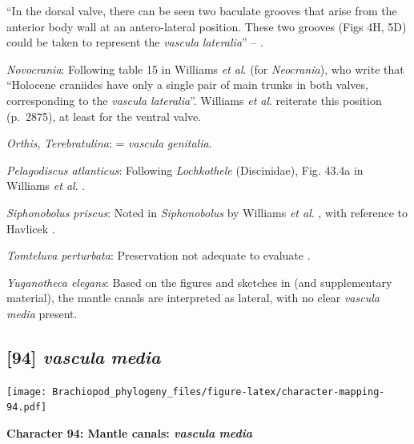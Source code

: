 \documentclass[openany]{book}
\theoremstyle{definition}
\theoremstyle{definition}
\theoremstyle{definition}
\theoremstyle{remark}
\begin{document}
``In the dorsal valve, there can be seen two baculate grooves that arise
from the\\
anterior body wall at an antero-lateral position. These two grooves
(Figs 4H, 5D) could be taken to represent the \emph{vascula}
\emph{lateralia}'' -- \citet{Zhang2007Agregarious}.

\hypertarget{Novocrania-coding-93}{}
\emph{Novocrania}: Following table 15 in Williams \emph{et al}.
\citeyearpar{Williams2000LinguliformeaCraniiformea} (for
\emph{Neocrania}), who write that ``Holocene craniides have only a
single pair of main trunks in both valves, corresponding to the
\emph{vascula} \emph{lateralia}''. Williams \emph{et al}.
\citeyearpar{Williams2007Supplement} reiterate this position (p.~2875),
at least for the ventral valve.

\hypertarget{Orthis-coding-93}{}
\emph{Orthis}, \emph{Terebratulina}: = \emph{vascula} \emph{genitalia}.

\hypertarget{Pelagodiscus_atlanticus-coding-93}{}
\emph{Pelagodiscus atlanticus}: Following \emph{Lochkothele}
(Discinidae), Fig. 43.4a in Williams \emph{et al}.
\citeyearpar{Williams2000LinguliformeaCraniiformea}.

\hypertarget{Siphonobolus_priscus-coding-93}{}
\emph{Siphonobolus priscus}: Noted in \emph{Siphonobolus} by Williams
\emph{et al}. \citeyearpar{Williams2000LinguliformeaCraniiformea}, with
reference to Havlicek \citeyearpar{Havlicek1982LingulaceaPaterinacea}.

\hypertarget{Tomteluva_perturbata-coding-93}{}
\emph{Tomteluva perturbata}: Preservation not adequate to evaluate
\citep{Streng2016Anew}.

\hypertarget{Yuganotheca_elegans-coding-93}{}
\emph{Yuganotheca elegans}: Based on the figures and sketches in
\citet{Zhang2014Anearly} (and supplementary material), the mantle canals
are interpreted as lateral, with no clear \emph{vascula} \emph{media}
present.

\subsection*{\texorpdfstring{{[}94{]} \emph{vascula}
\emph{media}}{{[}94{]} vascula media}}\label{vascula-media}

\texttt{[image: Brachiopod\_phylogeny\_files/figure-latex/character-mapping-94.pdf]}

\textbf{Character 94: Mantle canals: \emph{vascula} \emph{media}}
\end{document}
